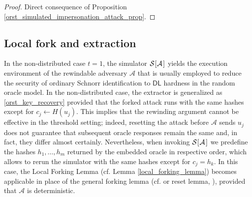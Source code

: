 \documentclass{iacrtrans}
\begin{document}
\begin{proof}
Direct consequence of Proposition
\ref{orst_simulated_impersonation_attack_prop}.
\end{proof}

\subsection{Local fork and extraction}\label{section_extractability}

In the non-distributed case $t=1$,
the simulator
$\mathcal{S}\hspace{0.5pt}[\hspace{0.5pt}\mathcal{A}\hspace{1pt}]$
yields the execution environment of the rewindable adversary
$\mathcal{A}$ that is usually employed to
reduce the security of ordinary Schnorr identification
to $\mathsf{DL}$ hardness in the random oracle model.
In the non-distributed case, the extractor is generalized as
\eqref{orst_key_recovery}
provided that the forked attack runs with the same hashes
except for $c_j \leftarrow H(u_j)$.
This implies that the rewinding argument
cannot be effective in the threshold setting;
indeed, resetting the attack before
$\mathcal{A}$ sends $u_j$ does not
guarantee that subsequent oracle responses remain the same
and, in fact, they differ almost certainly.
Nevertheless, when invoking
$\mathcal{S}\hspace{0.5pt}[\hspace{0.5pt}\mathcal{A}\hspace{1pt}]$
we predefine the hashes $h_1, \dots, h_m$
returned by the embedded oracle in respective order,
which allows to rerun the simulator with the same hashes
except for $c_j = h_k$.
In this case, the Local Forking Lemma
(cf. Lemma \ref{local_forking_lemma})
becomes applicable in place of the general forking lemma
(cf. \cite{paper_bellare_musig}
or reset lemma, \cite{paper_bellare_palacio}),
provided that $\mathcal{A}$
is deterministic.
\end{document}

